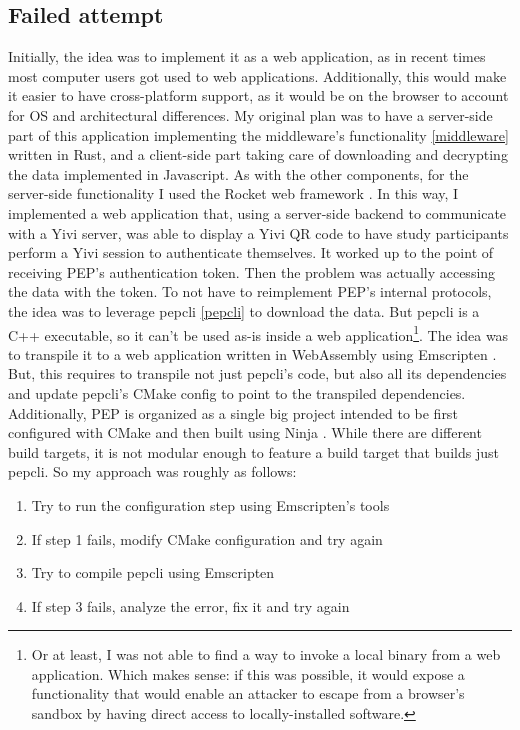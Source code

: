 \documentclass{report}
\begin{document}
\subsection{Failed attempt}
Initially, the idea was to implement it as a web application, as in recent times most computer users got used to web applications. Additionally, this would make it easier to have
cross-platform support, as it would be on the browser to account for OS and architectural differences. My original plan was to have a server-side part of this application
implementing the middleware's functionality \ref{middleware} written in Rust, and a client-side part taking care of downloading and decrypting the data implemented in Javascript.
As with the other components, for the server-side functionality I used the Rocket web framework \cite{rocket}.
In this way, I implemented a web application that, using a server-side backend to communicate with a Yivi server, was able to display a Yivi QR code to have study participants
perform a Yivi session to authenticate themselves. It worked up to the point of receiving PEP's authentication token. Then the problem was actually accessing the data with the
token. To not have to reimplement PEP's internal protocols, the idea was to leverage pepcli \ref{pepcli} to download the data. But pepcli is a C++ executable, so it can't be used
as-is inside a web application\footnote{Or at least, I was not able to find a way to invoke a local binary from a web application. Which makes sense: if this was possible, it would
expose a functionality that would enable an attacker to escape from a browser's sandbox by having direct access to locally-installed software.}. The idea was to transpile it to a web 
application written in WebAssembly using Emscripten \cite{emscripten}. But, this requires to transpile not
just pepcli's code, but also all its dependencies and update pepcli's CMake config to point to the transpiled dependencies. Additionally, PEP is organized as a single big project
intended to be first configured with CMake and then built using Ninja \cite{ninja}. While there are different build targets, it is not modular enough
to feature a build target that builds just pepcli. So my approach was roughly as follows:

\begin{enumerate}
		\item Try to run the configuration step using Emscripten's tools
		\item If step 1 fails, modify CMake configuration and try again
		\item Try to compile pepcli using Emscripten
		\item If step 3 fails, analyze the error, fix it and try again 
\end{enumerate}
\end{document}
